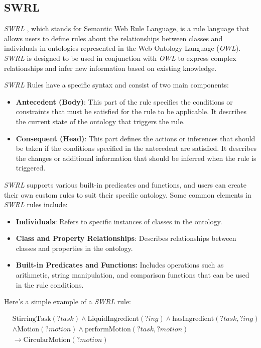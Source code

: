 \subsection{SWRL}
\label{sec:SWRL}
\textit{SWRL} \cite{Horrocks2004}, which stands for Semantic Web Rule Language, is a rule language that allows users to define rules about the relationships between classes and individuals in ontologies represented in the Web Ontology Language (\textit{OWL}). \textit{SWRL} \cite{Horrocks2004} is designed to be used in conjunction with \textit{OWL} to express complex relationships and infer new information based on existing knowledge.

\textit{SWRL} \cite{Horrocks2004} Rules have a specific syntax and consist of two main components:
\begin{itemize}
	\item \textbf{Antecedent (Body)}: This part of the rule specifies the conditions or constraints that must be satisfied for the rule to be applicable. It describes the current state of the ontology that triggers the rule.
	\item \textbf{Consequent (Head)}: This part defines the actions or inferences that should be taken if the conditions specified in the antecedent are satisfied. It describes the changes or additional information that should be inferred when the rule is triggered.
\end{itemize}
\textit{SWRL} \cite{Horrocks2004} supports various built-in predicates and functions, and users can create their own custom rules to suit their specific ontology. Some common elements in \textit{SWRL} \cite{Horrocks2004} rules include:
\begin{itemize}
	\item \textbf{Individuals}: Refers to specific instances of classes in the ontology.
	\item \textbf{Class and Property Relationships}: Describes relationships between classes and properties in the ontology.
	\item \textbf{Built-in Predicates and Functions:} Includes operations such as arithmetic, string manipulation, and comparison functions that can be used in the rule conditions.
\end{itemize}

Here's a simple example of a \textit{SWRL} \cite{Horrocks2004} rule:

\[
\begin{aligned}
&\text{StirringTask}(?task) \land \text{LiquidIngredient}(?ing) \land \text{hasIngredient}(?task, ?ing)\\
&\land \text{Motion}(?motion) \land \text{performMotion}(?task, ?motion)\\
&\rightarrow \text{CircularMotion}(?motion)
\end{aligned}
\]

